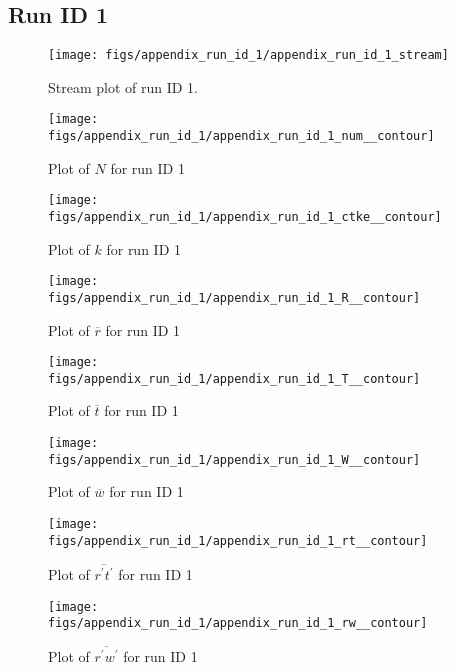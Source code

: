 \subsection{Run ID 1}
\begin{figure}[H]
\centering
\texttt{[image: figs/appendix\_run\_id\_1/appendix\_run\_id\_1\_stream]}
\caption{Stream plot of run ID 1.}
\label{fig:appendix_run_id_1_stream}
\end{figure}


\begin{figure}[H]
\centering
\texttt{[image: figs/appendix\_run\_id\_1/appendix\_run\_id\_1\_num\_\_contour]}
\caption{Plot of $N$ for run ID 1}
\label{fig:appendix_run_id_1_num__contour}
\end{figure}


\begin{figure}[H]
\centering
\texttt{[image: figs/appendix\_run\_id\_1/appendix\_run\_id\_1\_ctke\_\_contour]}
\caption{Plot of $k$ for run ID 1}
\label{fig:appendix_run_id_1_ctke__contour}
\end{figure}


\begin{figure}[H]
\centering
\texttt{[image: figs/appendix\_run\_id\_1/appendix\_run\_id\_1\_R\_\_contour]}
\caption{Plot of $\overline{r}$ for run ID 1}
\label{fig:appendix_run_id_1_R__contour}
\end{figure}


\begin{figure}[H]
\centering
\texttt{[image: figs/appendix\_run\_id\_1/appendix\_run\_id\_1\_T\_\_contour]}
\caption{Plot of $\overline{t}$ for run ID 1}
\label{fig:appendix_run_id_1_T__contour}
\end{figure}


\begin{figure}[H]
\centering
\texttt{[image: figs/appendix\_run\_id\_1/appendix\_run\_id\_1\_W\_\_contour]}
\caption{Plot of $\overline{w}$ for run ID 1}
\label{fig:appendix_run_id_1_W__contour}
\end{figure}


\begin{figure}[H]
\centering
\texttt{[image: figs/appendix\_run\_id\_1/appendix\_run\_id\_1\_rt\_\_contour]}
\caption{Plot of $\overline{r^\prime t^\prime}$ for run ID 1}
\label{fig:appendix_run_id_1_rt__contour}
\end{figure}


\begin{figure}[H]
\centering
\texttt{[image: figs/appendix\_run\_id\_1/appendix\_run\_id\_1\_rw\_\_contour]}
\caption{Plot of $\overline{r^\prime w^\prime}$ for run ID 1}
\label{fig:appendix_run_id_1_rw__contour}
\end{figure}


